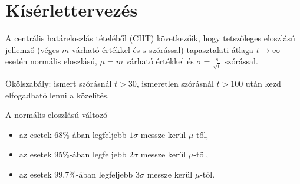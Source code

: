 \section{Kísérlettervezés}

A centrális határeloszlás tételéből (CHT) következőik, hogy tetszőleges eloszlású jellemző (véges $m$ várható értékkel és $s$ szórással) tapasztalati átlaga $t \rightarrow \infty$ esetén normális eloszlású, $\mu = m$ várható értékkel és $\sigma = \frac{s}{\sqrt{t}}$ szórással. 

Ökölszabály: ismert szórásnál $t > 30$, ismeretlen szórásnál $t > 100$ után kezd elfogadható lenni a közelítés.

A normális eloszlású változó 
\begin{itemize}
	\item az esetek 68\%-ában legfeljebb $1\sigma$ messze kerül $\mu$-től,
	\item az esetek 95\%-ában legfeljebb $2\sigma$ messze kerül $\mu$-től,
	\item az esetek 99,7\%-ában legfeljebb $3\sigma$ messze kerül $\mu$-től.
\end{itemize}

